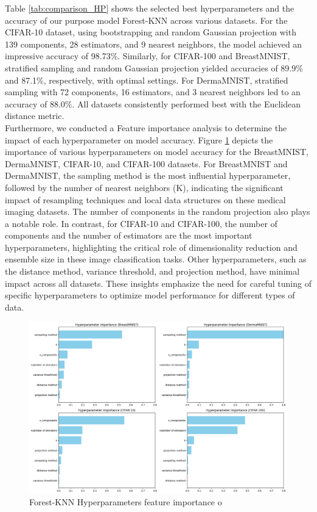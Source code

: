 \documentclass[a4paper]{article}
\begin{document}
Table \ref{tab:comparison_HP} shows the selected best hyperparameters and the accuracy of our purpose model Forest-KNN across various datasets. For the CIFAR-10 dataset, using bootstrapping and random Gaussian projection with 139 components, 28 estimators, and 9 nearest neighbors, the model achieved an impressive accuracy of 98.73\%. Similarly, for CIFAR-100 and BreastMNIST, stratified sampling and random Gaussian projection yielded accuracies of 89.9\% and 87.1\%, respectively, with optimal settings. For DermaMNIST, stratified sampling with 72 components, 16 estimators, and 3 nearest neighbors led to an accuracy of 88.0\%. All datasets consistently performed best with the Euclidean distance metric.\\
Furthermore, we conducted a Feature importance analysis to determine the impact of each hyperparameter on model accuracy. Figure \ref{fig:HP_impact} depicts the importance of various hyperparameters on model accuracy for the BreastMNIST, DermaMNIST, CIFAR-10, and CIFAR-100 datasets. For BreastMNIST and DermaMNIST, the sampling method is the most influential hyperparameter, followed by the number of nearest neighbors (K), indicating the significant impact of resampling techniques and local data structures on these medical imaging datasets. The number of components in the random projection also plays a notable role. In contrast, for CIFAR-10 and CIFAR-100, the number of components and the number of estimators are the most important hyperparameters, highlighting the critical role of dimensionality reduction and ensemble size in these image classification tasks. Other hyperparameters, such as the distance method, variance threshold, and projection method, have minimal impact across all datasets. These insights emphasize the need for careful tuning of specific hyperparameters to optimize model performance for different types of data.

\begin{figure}
    \centering
    \includegraphics[width=0.99\linewidth]{OFU-xAI-Proj-Template_v0.2/images/HP_impact.png}
    \caption{Forest-KNN Hyperparameters feature importance o}
    \label{fig:HP_impact}
\end{figure}
\end{document}
